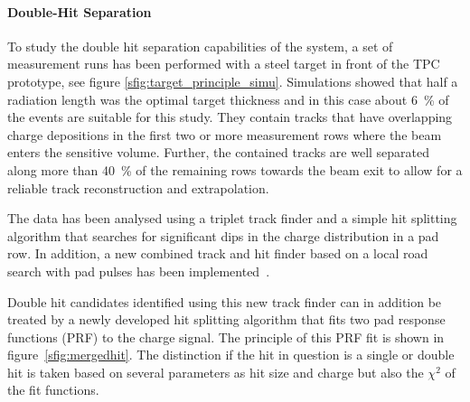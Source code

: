 \paragraph{Double-Hit Separation}

To study the double hit separation capabilities of the system, a set of measurement runs has been performed with a steel target in front of the TPC prototype, see figure \ref{sfig:target_principle_simu}. 
Simulations showed that half a radiation length was the optimal target thickness and in this case about \SI{6}{\percent} of the events are suitable for this study.
They contain tracks that have overlapping charge depositions in the first two or more measurement rows where the beam enters the sensitive volume. 
Further, the contained tracks are well separated along more than \SI{40}{\percent} of the remaining rows towards the beam exit to allow for a reliable track reconstruction and extrapolation.

The data has been analysed using a triplet track finder and a simple hit splitting algorithm that searches for significant dips in the charge distribution in a pad row. 
In addition, a new combined track and hit finder based on a local road search with pad pulses has been implemented~\cite{Kleinwort:395416}. 

Double hit candidates identified using this new track finder can in addition be treated by a newly developed hit splitting algorithm that fits two pad response functions (PRF) to the charge signal.
The principle of this PRF fit is shown in figure~\ref{sfig:mergedhit}. 
The distinction if the hit in question is a single or double hit is taken based on several parameters as hit size and charge but also the $\chi^2$ of the fit functions.

